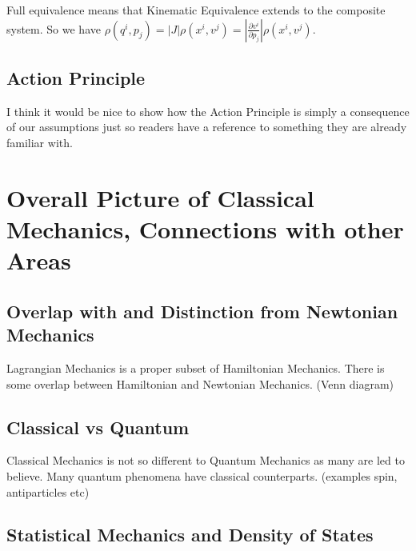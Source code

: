 \documentclass{article}
\begin{document}
\begin{prop}
	Full equivalence means that Kinematic Equivalence extends to the composite system. So we have $\rho(q^i,p_j) = \left|J\right|\rho(x^i,v^j) = \left|\frac{\partial v^i}{\partial p_j}\right|\rho(x^i,v^j)$. 
\end{prop}

\subsection{Action Principle}

I think it would be nice to show how the Action Principle is simply a consequence of our assumptions just so readers have a reference to something they are already familiar with.

\section{Overall Picture of Classical Mechanics, Connections with other Areas}
	
\subsection{Overlap with and Distinction from Newtonian Mechanics}

\begin{prop}
	Lagrangian Mechanics is a proper subset of Hamiltonian Mechanics. There is some overlap between Hamiltonian and Newtonian Mechanics. (Venn diagram)
\end{prop}
	
\subsection{Classical vs Quantum}

	Classical Mechanics is not so different to Quantum Mechanics as many are led to believe. Many quantum phenomena have classical counterparts. (examples spin, antiparticles etc)

\subsection{Statistical Mechanics and Density of States}
\end{document}
